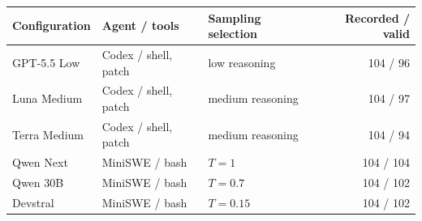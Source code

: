 \begin{tabular}{lllr}
\toprule
Configuration & Agent / tools & Sampling selection & Recorded / valid\\
\midrule
GPT-5.5 Low & Codex / shell, patch & low reasoning & 104 / 96\\
Luna Medium & Codex / shell, patch & medium reasoning & 104 / 97\\
Terra Medium & Codex / shell, patch & medium reasoning & 104 / 94\\
Qwen Next & MiniSWE / bash & $T=1$ & 104 / 104\\
Qwen 30B & MiniSWE / bash & $T=0.7$ & 104 / 102\\
Devstral & MiniSWE / bash & $T=0.15$ & 104 / 102\\
\bottomrule
\end{tabular}

